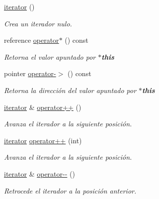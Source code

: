\begin{DoxyCompactItemize}
\item 
\hyperlink{classaed2_1_1iterator_1_1iterator_ae488782067dfba96b447080b0db1ed2c_ae488782067dfba96b447080b0db1ed2c}{iterator} ()
\begin{DoxyCompactList}\small\item\em \-Crea un iterador nulo. \end{DoxyCompactList}\item 
reference \hyperlink{classaed2_1_1iterator_1_1iterator_abc83982866d43a19f4b43e7ea7660402_abc83982866d43a19f4b43e7ea7660402}{operator$\ast$} () const 
\begin{DoxyCompactList}\small\item\em \-Retorna el valor apuntado por {\bfseries $\ast$this} \end{DoxyCompactList}\item 
pointer \hyperlink{classaed2_1_1iterator_1_1iterator_a4d20575249803ebf2604c1e58debc5cf_a4d20575249803ebf2604c1e58debc5cf}{operator-\/$>$} () const 
\begin{DoxyCompactList}\small\item\em \-Retorna la dirección del valor apuntado por {\bfseries $\ast$this} \end{DoxyCompactList}\item 
\hyperlink{classaed2_1_1iterator_1_1iterator}{iterator} \& \hyperlink{classaed2_1_1iterator_1_1iterator_a457fdf0ed06c88121b441424f1c99f4f_a457fdf0ed06c88121b441424f1c99f4f}{operator++} ()
\begin{DoxyCompactList}\small\item\em \-Avanza el iterador a la siguiente posición. \end{DoxyCompactList}\item 
\hyperlink{classaed2_1_1iterator_1_1iterator}{iterator} \hyperlink{classaed2_1_1iterator_1_1iterator_aa2023454f3ce45f7da4ef23d7a7f6749_aa2023454f3ce45f7da4ef23d7a7f6749}{operator++} (int)
\begin{DoxyCompactList}\small\item\em \-Avanza el iterador a la siguiente posición. \end{DoxyCompactList}\item 
\hyperlink{classaed2_1_1iterator_1_1iterator}{iterator} \& \hyperlink{classaed2_1_1iterator_1_1iterator_a260692ee1d51f87ef547b4a798fc2de5_a260692ee1d51f87ef547b4a798fc2de5}{operator-\/-\/} ()
\begin{DoxyCompactList}\small\item\em \-Retrocede el iterador a la posición anterior. \end{DoxyCompactList}\item 

\end{DoxyCompactItemize}
